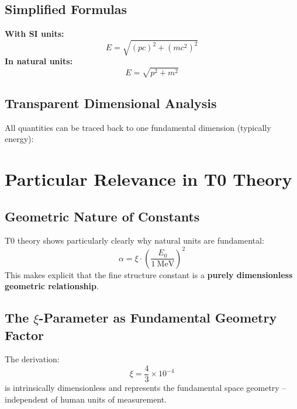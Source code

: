 	\subsection{Simplified Formulas}
	\textbf{With SI units:}
	\begin{equation}
		E = \sqrt{(p c)^2 + (m c^2)^2}
	\end{equation}
	\textbf{In natural units:}
	\begin{equation}
		E = \sqrt{p^2 + m^2}
	\end{equation}
	
	\subsection{Transparent Dimensional Analysis}
	All quantities can be traced back to one fundamental dimension (typically energy):
	\begin{table}[h]
		\centering
		\caption{Dimensional relationships in natural units}
	\end{table}
	
	\section{Particular Relevance in T0 Theory}
	
	\subsection{Geometric Nature of Constants}
	T0 theory shows particularly clearly why natural units are fundamental:
	\begin{equation}
		\alpha = \xi \cdot \left( \frac{E_0}{1~\mathrm{MeV}} \right)^2
	\end{equation}
	This makes explicit that the fine structure constant is a \textbf{purely dimensionless geometric relationship}.
	
	\subsection{The $\xi$-Parameter as Fundamental Geometry Factor}
	The derivation:
	\begin{equation}
		\xi = \frac{4}{3} \times 10^{-4}
	\end{equation}
	is intrinsically dimensionless and represents the fundamental space geometry -- independent of human units of measurement.
	
